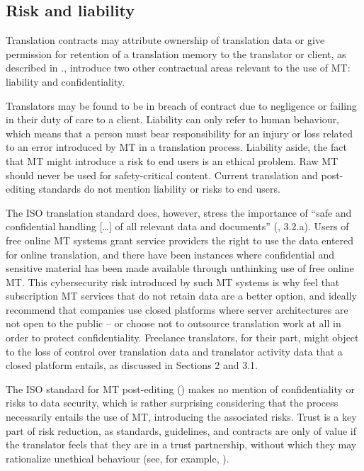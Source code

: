 \documentclass[output=paper]{langscibook}
\begin{document}
\subsection{Risk and liability}\label{sec:moorkens:3.2}

Translation contracts may attribute ownership of translation data or give permission for retention of a translation memory to the translator or client, as described in ., \citet{CanforaOttmann2020} introduce two other contractual areas relevant to the use of MT: liability and confidentiality.

Translators may be found to be in breach of contract due to negligence or failing in their duty of care to a client. Liability can only refer to human behaviour, which means that a person must bear responsibility for an injury or loss related to an error introduced by MT in a translation process. Liability aside, the fact that MT might introduce a risk to end users is an ethical problem. Raw MT should never be used for safety-critical content. Current translation and post-editing standards do not mention liability or risks to end users. 

The ISO translation standard does, however, stress the importance of “safe and confidential handling […] of all relevant data and documents” (\citealt{ISO2015}, 3.2.a). Users of free online MT systems grant service providers the right to use the data entered for online translation, and there have been instances where confidential and sensitive material has been made available through unthinking use of free online MT. This cybersecurity risk introduced by such MT systems is why \citet{CanforaOttmann2020} feel that subscription MT services that do not retain data are a better option, and ideally recommend that companies use closed platforms where server architectures are not open to the public – or choose not to outsource translation work at all in order to protect confidentiality. Freelance translators, for their part, might object to the loss of control over translation data and translator activity data that a closed platform entails, as discussed in Sections 2 and 3.1.

The ISO standard for MT post-editing (\citealt{ISO2017}) makes no mention of confidentiality or risks to data security, which is rather surprising considering that the process necessarily entails the use of MT, introducing the associated risks. Trust is a key part of risk reduction, as standards, guidelines, and contracts are only of value if the translator feels that they are in a trust partnership, without which they may rationalize unethical behaviour (see, for example, \citealt{Abdallah2010}).
\end{document}
